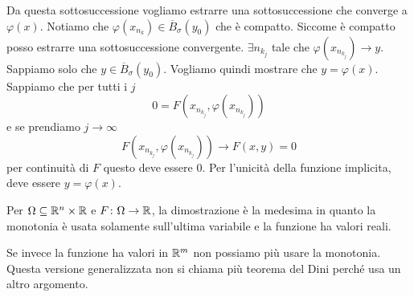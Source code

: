 \documentclass[a4paper]{article}
\begin{document}
\begin{radioactive}
\begin{snippetproof}{}
    Da questa sottosuccessione vogliamo estrarre una sottosuccessione che converge a
    \(\varphi(x)\).
    Notiamo che \(\varphi(x_{n_k}) \in \overline{B}_\sigma(y_0)\)
    che è compatto.
    Siccome è compatto posso estrarre una sottosuccessione convergente.
    \(\exists n_{k_j}\) tale che \(\varphi(x_{n_{k_j}}) \to y\).
    Sappiamo solo che \(y \in \overline{B}_\sigma(y_0)\).
    Vogliamo quindi mostrare che \(y = \varphi(x)\).
    Sappiamo che per tutti i \(j\)
    \[
        0 = F(x_{n_{k_j}}, \varphi(x_{n_{k_j}}))
    \]
    e se prendiamo \(j \to \infty\)
    \[
        F(x_{n_{k_j}}, \varphi(x_{n_{k_j}})) \to F(x,y) = 0
    \]
    per continuità di \(F\) questo deve essere \(0\).
    Per l'unicità della funzione implicita, deve essere \(y = \varphi(x)\).
\end{snippetproof}
\end{radioactive}

\begin{radioactive}
Per \(\Omega \subseteq \mathbb{R}^n \times \mathbb{R}\)
e \(F \colon \Omega \to \mathbb{R}\), la dimostrazione è la medesima
in quanto la monotonia è usata solamente sull'ultima variabile
e la funzione ha valori reali.

Se invece la funzione ha valori in \(\mathbb{R}^m\)
non possiamo più usare la monotonia. Questa versione generalizzata
non si chiama più teorema del Dini perché usa un altro argomento.
\end{radioactive}
\end{document}
